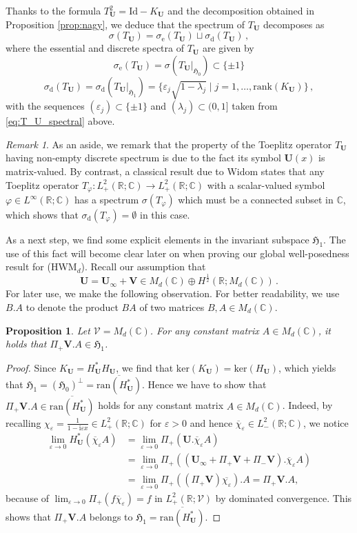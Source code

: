 \documentclass[11pt,reqno]{amsart}
\newtheorem{prop}{Proposition}[section]
\theoremstyle{definition}
\theoremstyle{remark}
\theoremstyle{remark}
\newtheorem*{remark*}{Remark}
\numberwithin{equation}{section}
\newcommand{\Hfr}{\mathfrak{H}}
\newcommand{\C}{\mathbb{C}}
\newcommand{\R}{\mathbb{R}}
\newcommand{\VV}{\mathcal{V}}
\newcommand{\ov}{\overline}
\newcommand{\ran}{\mathrm{ran}}
\renewcommand{\ker}{\mathrm{ker}}
\newcommand{\rank}{\mathrm{rank}}
\newcommand{\be}{\begin{equation}}
\newcommand{\ee}{\end{equation}}
\newcommand{\eps}{\varepsilon}
\newcommand{\ii}{\mathrm{i}}
\newcommand{\Vb}{\mathbf{V}}
\newcommand{\Ub}{\mathbf{U}}
\newcommand{\id}{\mathrm{Id}}
\renewcommand{\phi}{\varphi}
\begin{document}
Thanks to the formula $T_\Ub^2 = \id - K_\Ub$ and the decomposition obtained in Proposition \ref{prop:nagy}, we deduce that the spectrum of $T_\Ub$ decomposes as
$$
\sigma(T_\Ub) = \sigma_{\mathrm{e}}(T_\Ub) \sqcup \sigma_{\mathrm{d}}(T_\Ub) \, ,
$$
where the essential and discrete spectra of $T_\Ub$ are given by
$$
\sigma_{\mathrm{e}}(T_{\Ub}) = \sigma(T_{\Ub} |_{\Hfr_0})  \subset \{ \pm 1 \} 
$$
$$
\sigma_{\mathrm{d}}(T_{\Ub}) = \sigma_{\mathrm{d}}( T_{\Ub} |_{\Hfr_1}) = \{ \eps_j \sqrt{1-\lambda_j} \mid j=1,\ldots, \rank(K_\Ub) \}  \, ,
$$
with the sequences $(\eps_j)\subset \{ \pm 1 \}$ and $(\lambda_j) \subset (0, 1]$  taken from  \eqref{eq:T_U_spectral} above.

\begin{remark*}
As an aside, we remark that the property of the Toeplitz operator $T_{\Ub}$ having non-empty discrete spectrum is due to the fact its symbol $\Ub(x)$ is matrix-valued. By contrast, a classical result due to Widom \cite{Wi-64} states that any Toeplitz operator $T_\phi : L^2_+(\R; \C) \to L^2_+(\R; \C)$ with a scalar-valued symbol $\phi \in L^\infty(\R; \C)$ has a spectrum $\sigma(T_\phi)$ which must be a connected subset in $\C$, which shows that $\sigma_{\mathrm{d}}(T_\phi) = \emptyset$ in this case.
\end{remark*}

As a next step, we find some explicit elements in the invariant subspace $\Hfr_1$. The use of this fact will become clear later on when proving our global well-posedness result for (HWM$_d$). Recall our assumption that
\be \label{eq:U_ass}
\Ub = \Ub_\infty + \Vb \in M_d(\C) \oplus H^{\frac 1 2}(\R; M_d(\C)) \, .
\ee
For later use, we make the following observation. For better readability, we use $B.A$ to denote the product $BA$ of two matrices $B, A\in M_d(\C)$.

\begin{prop} \label{prop:king}
Let $\VV = M_d(\C)$. For any constant matrix $A \in M_d(\C)$, it holds that $\Pi_+ \Vb.A \in \Hfr_1$.
\end{prop}


\begin{proof}
Since $K_{\Ub} = H^*_{\Ub} H_{\Ub}$, we find that $\ker(K_{\Ub}) = \ker(H_{\Ub})$, which yields that $\Hfr_1= (\Hfr_0)^\perp = \ov{\ran(H^*_\Ub)}$.  Hence we have to show that $\Pi_+ \Vb.A \in \ov{\ran(H^*_{\Ub})}$ holds for any constant matrix $A \in M_d(\C)$. Indeed, by recalling $\chi_\eps = \frac{1}{1-\ii \eps x} \in L^2_+(\R; \C)$ for $\eps> 0$ and hence $\ov{\chi}_\eps \in L^2_-(\R; \C)$, we notice
\begin{align*}
 \lim_{\eps \to 0} H^*_{\Ub}(\ov{\chi}_\eps A) & = \lim_{\eps \to 0} \Pi_+( \Ub. \ov{\chi}_\eps A) \\
& = \lim_{\eps \to 0} \Pi_+ ( (\Ub_\infty + \Pi_+ \Vb + \Pi_- \Vb). \ov{\chi}_\eps A ) \\
& = \lim_{\eps \to 0} \Pi_+( (\Pi_+\Vb) \ov{\chi_\eps}).A = \Pi_+ \Vb.A,
\end{align*}
because of $\lim_{\eps \to 0} \Pi_+ ( f \ov{\chi}_\eps) = f$ in $L^2_+(\R; \VV)$ by dominated convergence. This shows that $\Pi_+ \Vb.A$ belongs to $\Hfr_1=\ov{\ran(H^*_{\Ub})}$.
\end{proof}
\end{document}
